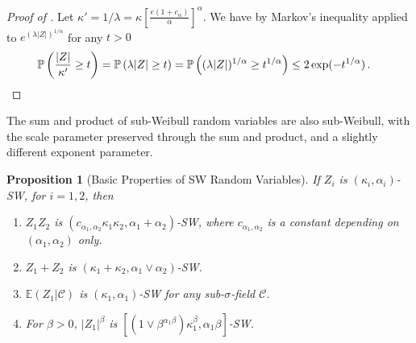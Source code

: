 \documentclass[11pt]{article}
\theoremstyle{plain}
\newtheorem{proposition}[theorem]{Proposition}
\begin{document}
\begin{proof}[Proof of ]
Let $\kappa'=1/\lambda=\kappa \left[\frac{e(1+c_\alpha)}{\alpha}\right]^\alpha$.
We have by Markov's inequality applied to $e^{(\lambda |Z|)^{1/\alpha}}$ for any $t>0$
\begin{align*}
    &\mathbb P\left(\frac{|Z|}{\kappa'}\ge t\right)=\mathbb P\left(\lambda |Z|\ge t\right)
    =\mathbb P\left((\lambda |Z|)^{1/\alpha}\ge t^{1/\alpha}\right)
    \le 2\exp(-t^{1/\alpha})\,. \qedhere
\end{align*}
\end{proof}


The sum and product of sub-Weibull random variables are also sub-Weibull, with the scale parameter preserved through the sum and product, and a slightly different exponent parameter.
\begin{proposition}[Basic Properties of SW Random Variables]\label{pro:2.5-sum-prod-sw}
    If $Z_i$ is $(\kappa_i,\alpha_i)$-SW, for $i=1,2$, then
    \begin{enumerate}
        \item $Z_1Z_2$ is $(c_{\alpha_1,\alpha_2}\kappa_1\kappa_2,\alpha_1+\alpha_2)$-SW, where $c_{\alpha_1,\alpha_2}$ is a constant depending on $(\alpha_1,\alpha_2)$ only.%
        \item $Z_1+Z_2$ is $(\kappa_1+\kappa_2, \alpha_1\vee\alpha_2)$-SW. %
        \item $\mathbb E(Z_1|\mathcal C)$ is $(\kappa_1,\alpha_1)$-SW for any sub-$\sigma$-field $\mathcal C$. %
        \item For $\beta>0$, $|Z_1|^\beta$ is $[(1\vee\beta^{\alpha_1\beta})\kappa_1^\beta,\alpha_1\beta]$-SW.
    \end{enumerate}
\end{proposition}
\end{document}

